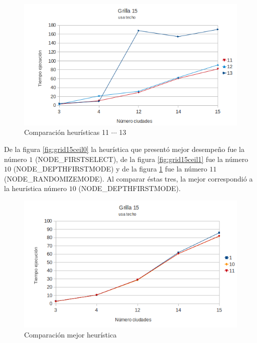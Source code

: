 \documentclass[10pt]{article}
\begin{document}
\begin{figure}[ht]
\begin{minipage}[b]{1\linewidth}
  \centering
 \includegraphics[scale=0.4]{grilla15ceil2.png}
 \caption{Comparación heurísticas  11 $\cdots$ 13}
 \label{fig:grid15ceil2}
\end{minipage}

\end{figure}



De la figura \ref{fig:grid15ceil0} la heurística que presentó mejor desempeño fue la número $1$ (NODE\_FIRSTSELECT), de la figura \ref{fig:grid15ceil1} fue la número $10$ (NODE\_DEPTHFIRSTMODE) y de la 
figura \ref{fig:grid15ceil2} fue la número $11$ (NODE\_RANDOMIZEMODE). Al comparar éstas tres, la mejor correspondió a la heurística número $10$ (NODE\_DEPTHFIRSTMODE).

\begin{figure}[ht]
\begin{minipage}[b]{1\linewidth}
 \centering
 \includegraphics[scale=0.4]{grilla15ceil3.png}
 \caption{Comparación mejor heurística}
 \label{fig:grid15ceil3}
\end{minipage}
\end{figure}
\end{document}
